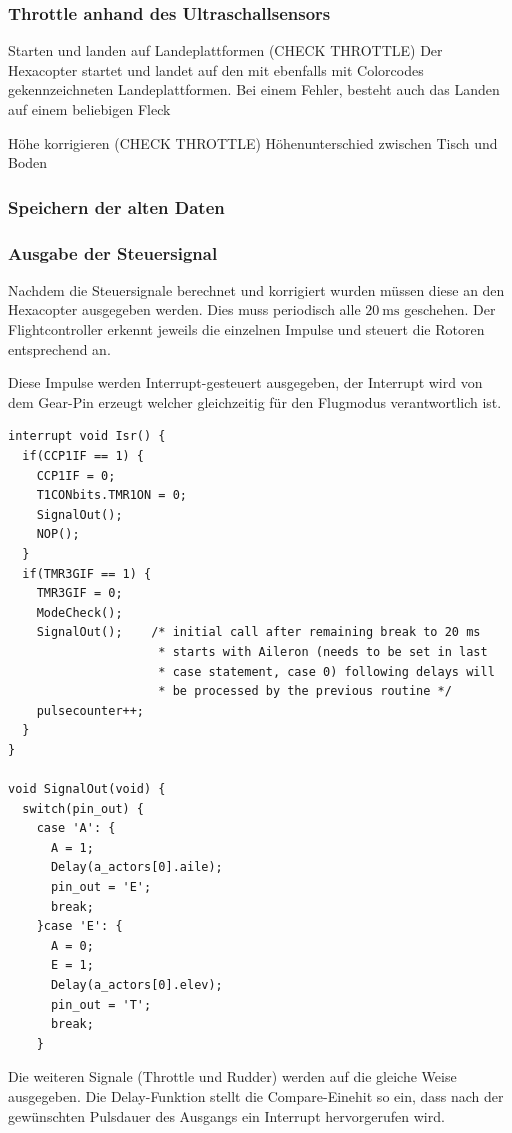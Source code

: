 \begin{itemize}
    \subsubsection{Throttle anhand des Ultraschallsensors}

    Starten und landen auf Landeplattformen (CHECK THROTTLE)
    Der Hexacopter startet und landet auf den mit ebenfalls mit Colorcodes gekennzeichneten Landeplattformen.
    Bei einem Fehler, besteht auch das Landen auf einem beliebigen Fleck

    Höhe korrigieren (CHECK THROTTLE)
    Höhenunterschied zwischen Tisch und Boden

    \subsubsection{Speichern der alten Daten}

    \subsubsection{Ausgabe der Steuersignal}
    Nachdem die Steuersignale berechnet und korrigiert wurden müssen diese an den Hexacopter ausgegeben werden. Dies muss periodisch alle $\SI{20}{\milli\second}$ geschehen.
    Der Flightcontroller erkennt jeweils die einzelnen Impulse und steuert die Rotoren entsprechend an.

    Diese Impulse werden Interrupt-gesteuert ausgegeben, der Interrupt wird von dem Gear-Pin erzeugt welcher gleichzeitig für den Flugmodus verantwortlich ist.

    \lstset{language = c}
    \begin{lstlisting}
interrupt void Isr() {
  if(CCP1IF == 1) {
    CCP1IF = 0;
    T1CONbits.TMR1ON = 0;
    SignalOut();
    NOP();
  }
  if(TMR3GIF == 1) {
    TMR3GIF = 0;
    ModeCheck();
    SignalOut();    /* initial call after remaining break to 20 ms
                     * starts with Aileron (needs to be set in last
                     * case statement, case 0) following delays will
                     * be processed by the previous routine */
    pulsecounter++;
  }
}

void SignalOut(void) {
  switch(pin_out) {
    case 'A': {
      A = 1;
      Delay(a_actors[0].aile);
      pin_out = 'E';
      break;
    }case 'E': {
      A = 0;
      E = 1;
      Delay(a_actors[0].elev);
      pin_out = 'T';
      break;
    }
    \end{lstlisting}
    Die weiteren Signale (Throttle und Rudder) werden auf die gleiche Weise ausgegeben.
    Die Delay-Funktion stellt die Compare-Einehit so ein, dass nach der gewünschten Pulsdauer des Ausgangs ein Interrupt hervorgerufen wird.


\end{itemize}
